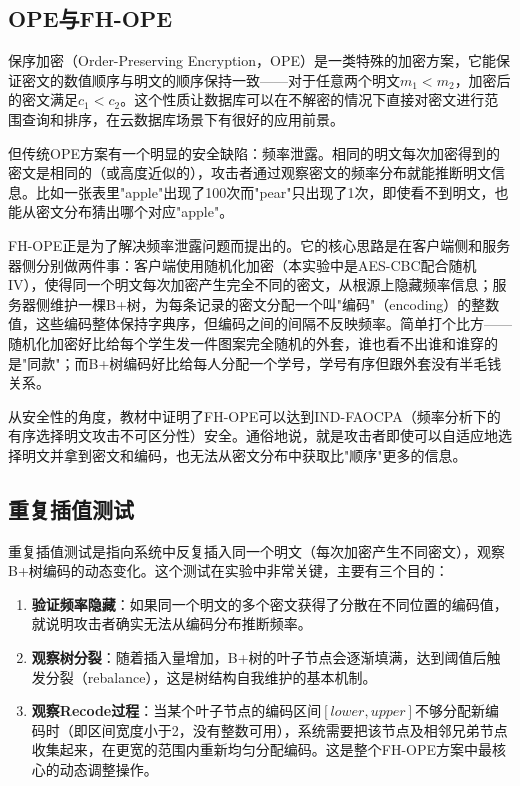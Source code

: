 \documentclass[a4paper]{article}
\begin{document}
\subsection{OPE与FH-OPE}

保序加密（Order-Preserving Encryption，OPE）是一类特殊的加密方案，它能保证密文的数值顺序与明文的顺序保持一致——对于任意两个明文$m_1 < m_2$，加密后的密文满足$c_1 < c_2$。这个性质让数据库可以在不解密的情况下直接对密文进行范围查询和排序，在云数据库场景下有很好的应用前景。

但传统OPE方案有一个明显的安全缺陷：频率泄露。相同的明文每次加密得到的密文是相同的（或高度近似的），攻击者通过观察密文的频率分布就能推断明文信息。比如一张表里"apple"出现了100次而"pear"只出现了1次，即使看不到明文，也能从密文分布猜出哪个对应"apple"。

FH-OPE正是为了解决频率泄露问题而提出的。它的核心思路是在客户端侧和服务器侧分别做两件事：客户端使用随机化加密（本实验中是AES-CBC配合随机IV），使得同一个明文每次加密产生完全不同的密文，从根源上隐藏频率信息；服务器侧维护一棵B+树，为每条记录的密文分配一个叫"编码"（encoding）的整数值，这些编码整体保持字典序，但编码之间的间隔不反映频率。简单打个比方——随机化加密好比给每个学生发一件图案完全随机的外套，谁也看不出谁和谁穿的是"同款"；而B+树编码好比给每人分配一个学号，学号有序但跟外套没有半毛钱关系。

从安全性的角度，教材中证明了FH-OPE可以达到IND-FAOCPA（频率分析下的有序选择明文攻击不可区分性）安全。通俗地说，就是攻击者即使可以自适应地选择明文并拿到密文和编码，也无法从密文分布中获取比"顺序"更多的信息。

\subsection{重复插值测试}

重复插值测试是指向系统中反复插入同一个明文（每次加密产生不同密文），观察B+树编码的动态变化。这个测试在实验中非常关键，主要有三个目的：

\begin{enumerate}
    \item \textbf{验证频率隐藏}：如果同一个明文的多个密文获得了分散在不同位置的编码值，就说明攻击者确实无法从编码分布推断频率。
    \item \textbf{观察树分裂}：随着插入量增加，B+树的叶子节点会逐渐填满，达到阈值后触发分裂（rebalance），这是树结构自我维护的基本机制。
    \item \textbf{观察Recode过程}：当某个叶子节点的编码区间$[lower, upper]$不够分配新编码时（即区间宽度小于2，没有整数可用），系统需要把该节点及相邻兄弟节点收集起来，在更宽的范围内重新均匀分配编码。这是整个FH-OPE方案中最核心的动态调整操作。
\end{enumerate}
\end{document}
